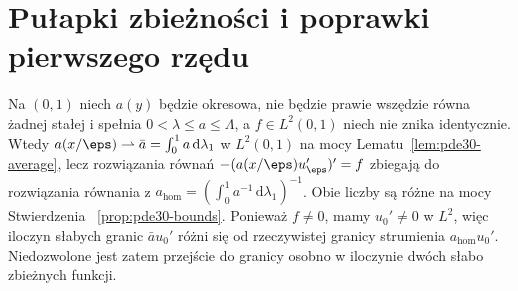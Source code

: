 \section{Pułapki zbieżności i poprawki pierwszego rzędu}
\begin{kontrprzyklad}
Na $(0,1)$ niech $a(y)$ będzie okresowa,
nie będzie prawie wszędzie równa żadnej stałej
i spełnia $0<\lambda\le a\le\Lambda$,
a $f\in L^2(0,1)$ niech nie znika identycznie.
Wtedy $a(x/\eps)\rightharpoonup\bar a
=\int_0^1 a\,\mathrm d\lambda_1$ w $L^2(0,1)$
na mocy Lematu~\ref{lem:pde30-average},
lecz rozwiązania równań $-(a(x/\eps)u_\eps')'=f$
zbiegają do rozwiązania równania z
$a_{\mathrm{hom}}=(\int_0^1a^{-1}\,\mathrm d\lambda_1)^{-1}$.
Obie liczby są różne na mocy Stwierdzenia
~\ref{prop:pde30-bounds}. Ponieważ $f\ne0$,
mamy $u_0'\ne0$ w $L^2$, więc iloczyn słabych
granic $\bar a u_0'$ różni się od rzeczywistej
granicy strumienia $a_{\mathrm{hom}}u_0'$.
Niedozwolone jest zatem przejście do granicy
osobno w iloczynie dwóch słabo zbieżnych funkcji.
\end{kontrprzyklad}

